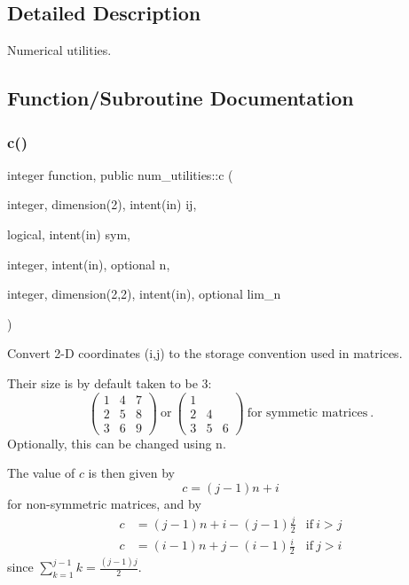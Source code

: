 \subsection{Detailed Description}
Numerical utilities. 

\subsection{Function/\+Subroutine Documentation}
\mbox{\label{namespacenum__utilities_a5ee3fbd1fe67d0deefc7194631389f2a}} 
\subsubsection{\texorpdfstring{c()}{c()}}
{\footnotesize\ttfamily integer function, public num\+\_\+utilities\+::c (\begin{DoxyParamCaption}\item[{integer, dimension(2), intent(in)}]{ij,  }\item[{logical, intent(in)}]{sym,  }\item[{integer, intent(in), optional}]{n,  }\item[{integer, dimension(2,2), intent(in), optional}]{lim\+\_\+n }\end{DoxyParamCaption})}



Convert 2-\/D coordinates (i,j) to the storage convention used in matrices. 

Their size is by default taken to be 3\+: \[ \left(\begin{array}{ccc} 1 & 4 & 7 \\ 2 & 5 & 8 \\ 3 & 6 & 9 \end{array}\right) \ \text{or} \ \left(\begin{array}{ccc} 1 & & \\ 2 & 4 & \\ 3 & 5 & 6 \end{array}\right) \ \text{for symmetic matrices} \ . \] Optionally, this can be changed using {\ttfamily n}.

The value of $c$ is then given by \[c = (j-1) n + i\] for non-\/symmetric matrices, and by \[\begin{aligned} c &= (j-1)n + i - (j-1)\frac{j}{2} & \text{if} \ i > j \\ c &= (i-1)n + j - (i-1)\frac{i}{2} & \text{if} \ j > i \end{aligned}\] since $\sum_{k=1}^{j-1} k = \frac{(j-1)j}{2}$.

